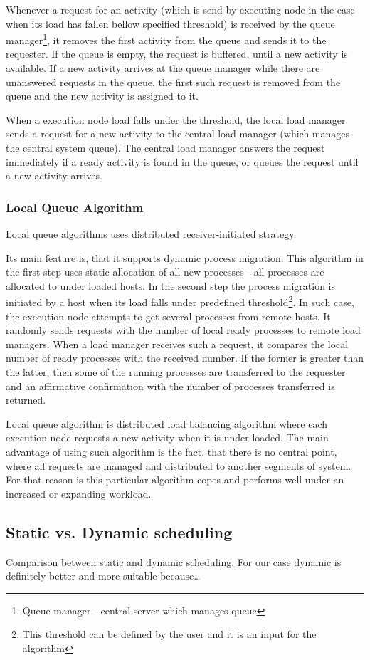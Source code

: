 Whenever a request for an activity (which is send by executing node in the case when its load has fallen bellow specified threshold)
is received by the queue manager\footnote{Queue manager - central server which manages queue},
it removes the first activity from the queue and sends it to the requester.
If the queue is empty, the request is buffered, until a new activity is available.
If a new activity arrives at the queue manager while there are unanswered requests in the queue,
the first such request is removed from the queue and the new activity is assigned to it.

When a execution node load falls under the threshold,
the local load manager sends a request for a new activity to the central load manager (which manages the central system queue).
The central load manager answers the request immediately if a ready activity is found in the queue,
or queues the request until a new activity arrives\cite{sharma2008performance}.


\subsubsection{Local Queue Algorithm}
Local queue algorithms uses distributed receiver-initiated strategy.

Its main feature is, that it supports dynamic process migration.
This algorithm in the first step uses static allocation of all new processes - all processes are allocated to under loaded hosts.
In the second step the process migration is initiated by a host when its load falls under predefined threshold\footnote{
This threshold can be defined by the user and it is an input for the algorithm}.
In such case, the execution node attempts to get several processes from remote hosts.
It randomly sends requests with the number of local ready processes to remote load managers.
When a load manager receives such a request, it compares the local number of ready processes with the received number.
If the former is greater than the latter, then some of the running processes are transferred to the requester
and an affirmative confirmation with the number of processes transferred is returned.\cite{sharma2008performance}

Local queue algorithm is distributed load balancing algorithm where each execution node requests a new activity when it is under loaded.
The main advantage of using such algorithm is the fact, that there is no central point,
where all requests are managed and distributed to another segments of system.
For that reason is this particular algorithm copes and performs well under an increased or expanding workload.

\subsection{Static vs.
Dynamic scheduling}\label{subsec:static-vs.-dynamic-scheduling}
Comparison between static and dynamic scheduling.
For our case dynamic is definitely better and more suitable because\ldots